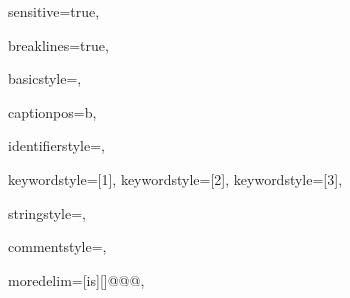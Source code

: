 {%
sensitive=true, 

breaklines=true,

basicstyle=\ttfamily,

captionpos=b,							

identifierstyle={\ttfamily\color{black}},

keywordstyle=[1]{\ttfamily\bfseries\color{red}},
keywordstyle=[2]{\ttfamily\bfseries\color{blue}},
keywordstyle=[3]{\ttfamily\bfseries},


stringstyle=\ttfamily,

commentstyle={\ttfamily\color{blue}},

moredelim=[is][\color{black}]{@@}{@},
}
